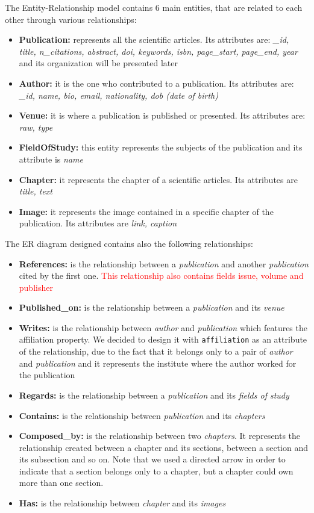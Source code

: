\documentclass{Configuration_Files/PoliMi3i_thesis}
\begin{document}
\bigskip
The Entity-Relationship model contains 6 main entities, that are related to each other through various relationships:
\begin{itemize}
	\item \textbf{Publication:} represents all the scientific articles. Its attributes are: \emph{\_id, title, n\_citations,
		abstract, doi, keywords, isbn, page\_start, page\_end, year} and its organization will be presented later
	\item \textbf{Author:} it is the one who contributed to a publication. Its attributes are: \emph{\_id, name, bio,
		email, nationality, dob (date of birth)}
	\item \textbf{Venue:} it is where a publication is published or presented. Its attributes are: \emph{raw, type}
	\item \textbf{FieldOfStudy:} this entity represents the subjects of the publication and its attribute is \emph{name}
	\item \textbf{Chapter:} it represents the chapter of a scientific articles. Its attributes are \emph{title, text}
	\item \textbf{Image:} it represents the image contained in a specific chapter of the publication. Its attributes are
		\emph{link, caption}
\end{itemize}

The ER diagram designed contains also the following relationships:
\begin{itemize}
	\item \textbf{References:} is the relationship between a \emph{publication} and another \emph{publication} cited by the first one.
		\textcolor{red}{This relationship also contains fields issue, volume and publisher}
	\item \textbf{Published\_on:} is the relationship between a \emph{publication} and its \emph{venue}
	\item \textbf{Writes:} is the relationship between \emph{author} and \emph{publication} which features the affiliation property.
		We decided to design it with \verb |affiliation| as an attribute of the relationship, due to the fact that it belongs
		only to a pair of \emph{author} and \emph{publication} and it represents the institute where the author worked for the publication
	\item \textbf{Regards:} is the relationship between a \emph{publication} and its \emph{fields of study}
	\item \textbf{Contains:} is the relationship between \emph{publication} and its \emph{chapters} 
	\item \textbf{Composed\_by:} is the relationship between two \emph{chapters}. It represents the relationship created
		between a chapter and its sections, between a section and its subsection and so on. Note that we used a directed
		arrow in order to indicate that a section belongs only to a chapter, but a chapter could own more than one section.
	\item \textbf{Has:} is the relationship between \emph{chapter} and its \emph{images}
\end{itemize}
\end{document}
